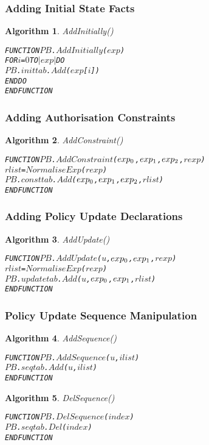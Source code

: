 \documentclass[11pt]{report}
\newenvironment{vverbatim}
{
  \begin{alltt}
}
{
    \vspace{-\baselineskip}
  \end{alltt}
}
\newtheorem{vvalgorithm}{Algorithm}[chapter]
\newenvironment{valgorithm}[2]
{
  \begin{vvalgorithm}{#1}
    \label{#2}
    \small
    \begin{vverbatim}
}
{
    \end{vverbatim}
  \end{vvalgorithm}
}
\begin{document}
        \subsubsection{Adding Initial State Facts}

          \begin{valgorithm}{AddInitially()}{algo-impln-adini}
FUNCTION \(PB\).\(AddInitially\)(\(exp\))
  FOR \(i\) = \(0\) TO \(|exp|\) DO
    \(PB\).\(inittab\).\(Add\)(\(exp\)[\(i\)])
  ENDDO
ENDFUNCTION
          \end{valgorithm}

        \subsubsection{Adding Authorisation Constraints}

          \begin{valgorithm}{AddConstraint()}{algo-impln-adcon}
FUNCTION \(PB\).\(AddConstraint\)(\(exp\sb{0}\), \(exp\sb{1}\), \(exp\sb{2}\), \(rexp\))
  \(rlist\) = \(NormaliseExp\)(\(rexp\))
  \(PB\).\(consttab\).\(Add\)(\(exp\sb{0}\), \(exp\sb{1}\), \(exp\sb{2}\), \(rlist\))
ENDFUNCTION
          \end{valgorithm}

        \subsubsection{Adding Policy Update Declarations}

          \begin{valgorithm}{AddUpdate()}{algo-impln-adupd}
FUNCTION \(PB\).\(AddUpdate\)(\(u\), \(exp\sb{0}\), \(exp\sb{1}\), \(rexp\))
  \(rlist\) = \(NormaliseExp\)(\(rexp\))
  \(PB\).\(updatetab\).\(Add\)(\(u\), \(exp\sb{0}\), \(exp\sb{1}\), \(rlist\))
ENDFUNCTION
          \end{valgorithm}

        \subsubsection{Policy Update Sequence Manipulation}

          \begin{valgorithm}{AddSequence()}{algo-impln-adseq}
FUNCTION \(PB\).\(AddSequence\)(\(u\), \(ilist\))
  \(PB\).\(seqtab\).\(Add\)(\(u\), \(ilist\))
ENDFUNCTION
          \end{valgorithm}

          \begin{valgorithm}{DelSequence()}{algo-impln-deseq}
FUNCTION \(PB\).\(DelSequence\)(\(index\))
  \(PB\).\(seqtab\).\(Del\)(\(index\))
ENDFUNCTION
          \end{valgorithm}
\end{document}
